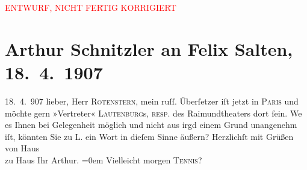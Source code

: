 
\begin{center}
            \textcolor{red}{ENTWURF, NICHT FERTIG KORRIGIERT}
                      \end{center}
            
         
         \renewcommand{\erwaehntePersonen}{Personen: Sigmund Lautenburg, Peter Rotenstern, Felix Salten}
         \renewcommand{\erwaehnteInstitutionen}{Institutionen: Raimund-Theater}
         \renewcommand{\erwaehnteOrte}{Orte: Paris, Russland, Wien}
         \renewcommand{\erwaehnteWerke}{}
               \section[Arthur Schnitzler an Felix Salten, 18. 4. 1907]{ Arthur Schnitzler an Felix Salten, 18. 4. 1907}\nopagebreak{}\rehead{ }\begin{ledgroupsized}[t]{13cm}\normalsize\beginnumbering \toendnotes[C]{\smallbreak\pagebreak[2]} 
\pstart
           \raggedleft{}{\pb}18. 4. 907\pend
           \pstart{}lieber,\pend\pstart
           Herr \textsc{Rotenstern}, mein ruſſ. Überſetzer iſt jetzt in \textsc{Paris} und möchte gern »Vertreter« \textsc{Lautenburg}s, \textsc{resp.} des Raimundtheaters dort ſein. We{\geminationn} es Ihnen bei
               Gelegenheit möglich  und nicht aus irgd einem
               Grund unangenehm iſt, könnten Sie zu L. ein
               Wort in dieſem Sinne äußern? \pend
           \pstart
           Herzlichſt mit Grüßen von Haus {\\[\baselineskip]}zu Haus Ihr \spacefill\mbox{Arthur.}\pend
           \leftskip=0em{}\pstart
           \noindent{}Vielleicht morgen \textsc{Tennis}? \pend
           
         
         \endnumbering{}\end{ledgroupsized}\begin{anhang}\end{anhang}\newcommand{\dateiname}{L03008}\newcommand{\titel}{Arthur Schnitzler an Felix Salten, 18. 4. 1907}\newcommand{\editorInnen}{Martin Anton Müller und Laura Untner}
      